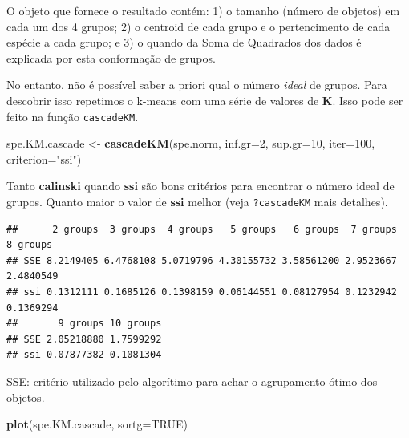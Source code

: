 \documentclass[
]{book}
\newenvironment{Shaded}{\begin{snugshade}}{\end{snugshade}}
\newcommand{\CommentTok}[1]{\textcolor[rgb]{0.56,0.35,0.01}{\textit{#1}}}
\newcommand{\DataTypeTok}[1]{\textcolor[rgb]{0.13,0.29,0.53}{#1}}
\newcommand{\DecValTok}[1]{\textcolor[rgb]{0.00,0.00,0.81}{#1}}
\newcommand{\KeywordTok}[1]{\textcolor[rgb]{0.13,0.29,0.53}{\textbf{#1}}}
\newcommand{\NormalTok}[1]{#1}
\newcommand{\OperatorTok}[1]{\textcolor[rgb]{0.81,0.36,0.00}{\textbf{#1}}}
\newcommand{\OtherTok}[1]{\textcolor[rgb]{0.56,0.35,0.01}{#1}}
\newcommand{\StringTok}[1]{\textcolor[rgb]{0.31,0.60,0.02}{#1}}
\begin{document}
O objeto que fornece o resultado contém: 1) o tamanho (número de objetos) em cada um dos 4 grupos; 2) o centroid de cada grupo e o pertencimento de cada espécie a cada grupo; e 3) o quando da Soma de Quadrados dos dados é explicada por esta conformação de grupos.

No entanto, não é possível saber a priori qual o número \emph{ideal} de grupos. Para descobrir isso repetimos o k-means com uma série de valores de \textbf{K}. Isso pode ser feito na função \texttt{cascadeKM}.

\begin{Shaded}
\begin{Highlighting}[]
\NormalTok{spe.KM.cascade <-}\StringTok{ }\KeywordTok{cascadeKM}\NormalTok{(spe.norm, }\DataTypeTok{inf.gr=}\DecValTok{2}\NormalTok{, }\DataTypeTok{sup.gr=}\DecValTok{10}\NormalTok{, }\DataTypeTok{iter=}\DecValTok{100}\NormalTok{, }\DataTypeTok{criterion=}\StringTok{"ssi"}\NormalTok{) }
\end{Highlighting}
\end{Shaded}

Tanto \textbf{calinski} quando \textbf{ssi} são bons critérios para encontrar o número ideal de grupos. Quanto maior o valor de \textbf{ssi} melhor (veja \texttt{?cascadeKM} mais detalhes).

\begin{Shaded}
\end{Shaded}

\begin{verbatim}
##      2 groups  3 groups  4 groups   5 groups   6 groups  7 groups  8 groups
## SSE 8.2149405 6.4768108 5.0719796 4.30155732 3.58561200 2.9523667 2.4840549
## ssi 0.1312111 0.1685126 0.1398159 0.06144551 0.08127954 0.1232942 0.1369294
##       9 groups 10 groups
## SSE 2.05218880 1.7599292
## ssi 0.07877382 0.1081304
\end{verbatim}

SSE: critério utilizado pelo algorítimo para achar o agrupamento ótimo dos objetos.

\begin{Shaded}
\begin{Highlighting}[]
\KeywordTok{plot}\NormalTok{(spe.KM.cascade, }\DataTypeTok{sortg=}\OtherTok{TRUE}\NormalTok{)}
\end{Highlighting}
\end{Shaded}
\end{document}
